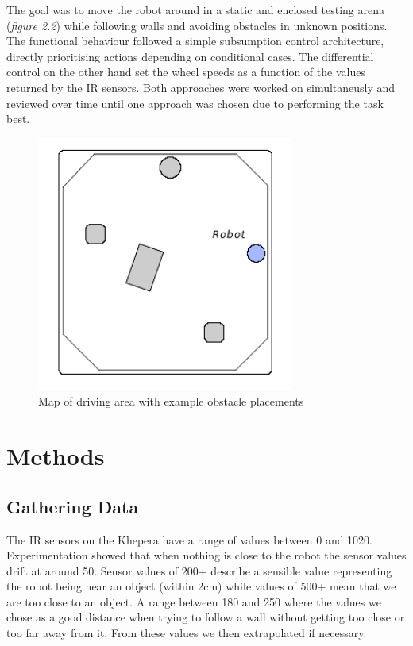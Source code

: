 \documentclass[paper=a4, fontsize=12pt]{scrartcl}	%
\numberwithin{equation}{section}		%
\numberwithin{figure}{section}			%
\numberwithin{table}{section}				%
\begin{document}
The goal was to move the robot around in a static and enclosed testing arena (\emph{figure 2.2}) while following walls and avoiding obstacles in unknown positions. The functional behaviour followed a simple subsumption control architecture, directly prioritising actions depending on conditional cases. The differential control on the other hand set the wheel speeds as a function of the values returned by the IR sensors. Both approaches were worked on simultaneusly and reviewed over time until one approach was chosen due to performing the task best.
\begin{figure}[!ht]
 \centering
  \includegraphics[width=0.75\textwidth]{mapexample}
  \caption{Map of driving area with example obstacle placements}
\end{figure}

\section{Methods}
\subsection{Gathering Data}
The IR sensors on the Khepera have a range of values between 0 and 1020. Experimentation showed that when nothing is close to the robot the sensor values drift at around 50. Sensor values of 200+ describe a sensible value representing the robot being near an object (within 2cm) while values of 500+ mean that we are too close to an object. A range between 180 and 250 where the values we chose as a good distance when trying to follow a wall without getting too close or too far away from it. From these values we then extrapolated if necessary.
\end{document}
